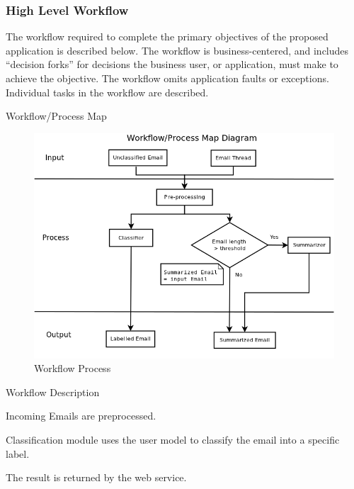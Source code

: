 \newpage
\subsubsection{High Level Workflow}
The workflow required to complete the primary objectives of the proposed 
application is described below. The workflow is business-centered, and 
includes ``decision forks'' for decisions the business user, or application, 
must make to achieve the objective. The workflow omits application faults or exceptions. 
Individual tasks in the workflow are described.

\begin{my_enumerate}
  \item Workflow/Process Map 
	
\begin{figure}[H]
  \centering
\includegraphics[width=13cm]{workflow_process_map.png}
  \caption[Workflow Process] {Workflow Process}
\end{figure}

  \item Workflow Description
  \begin{my_itemize}
    \item Incoming Emails are preprocessed.
    \item Classification module uses the user model to classify the email into a specific label.
    \item The result is returned by the web service.
  \end{my_itemize}
\end{my_enumerate}

